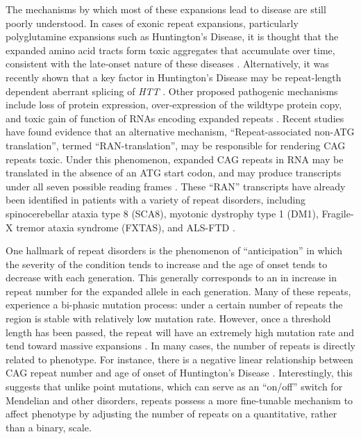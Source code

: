 
The mechanisms by which most of these expansions lead to disease are still poorly understood. In cases of exonic repeat expansions, particularly polyglutamine expansions such as Huntington's Disease, it is thought that the expanded amino acid tracts form toxic aggregates that accumulate over time, consistent with the late-onset nature of these diseases \cite{MichalikVanBroeckhoven2003}. Alternatively, it was recently shown that a key factor in Huntington's Disease may be repeat-length dependent aberrant splicing of \emph{HTT} \cite{SathasivamNeuederGipsonEtAl2013}. Other proposed pathogenic mechanisms include loss of protein expression, over-expression of the wildtype protein copy, and toxic gain of function of RNAs encoding expanded repeats \cite{Pearson2011}. Recent studies have found evidence that an alternative mechanism, ``Repeat-associated non-ATG translation'', termed ``RAN-translation'', may be responsible for rendering CAG repeats toxic. Under this phenomenon, expanded CAG repeats in RNA may be translated in the absence of an ATG start codon, and may produce transcripts under all seven possible reading frames \cite{Pearson2011}. These ``RAN'' transcripts have already been identified in patients with a variety of repeat disorders, including spinocerebellar ataxia type 8 (SCA8), myotonic dystrophy type 1 (DM1), Fragile-X tremor ataxia syndrome (FXTAS), and ALS-FTD \cite{ClearyRanum2014}.

One hallmark of repeat disorders is the phenomenon of ``anticipation'' in which the severity of the condition tends to increase and the age of onset tends to decrease with each generation. This generally corresponds to an in increase in repeat number for the expanded allele in each generation. Many of these repeats, experience a bi-phasic mutation process: under a certain number of repeats the region is stable with relatively low mutation rate. However, once a threshold length has been passed, the repeat will have an extremely high mutation rate and tend toward massive expansions \cite{BourgeoisCoffeyRiveraEtAl2009}. In many cases, the number of repeats is directly related to phenotype. For instance, there is a negative linear relationship between CAG repeat number and age of onset of Huntington's Disease \cite{Rubinsztein2002}. Interestingly, this suggests that unlike point mutations, which can serve as an ``on/off'' switch for Mendelian and other disorders, repeats possess a more fine-tunable mechanism to affect phenotype by adjusting the number of repeats on a quantitative, rather than a binary, scale.

